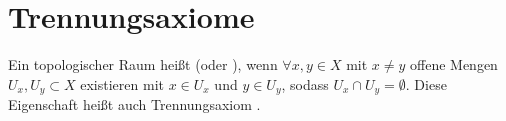 \section{Trennungsaxiome}
\begin{definition}\label{def:hausdorff}
    Ein topologischer Raum heißt  (oder ), wenn $\forall x,y\in X$ mit $x\neq y$ offene Mengen $U_x, U_y\subset X$ existieren mit $x\in U_x$ und $y\in U_y$, sodass $U_x \cap U_y = \emptyset$. Diese Eigenschaft heißt auch Trennungsaxiom . \\
    \begin{minipage}{\textwidth}
    \centering    
\begin{minipage}{0.3\textwidth}
        \centering
    \end{minipage}
    \end{minipage}
\end{definition}

